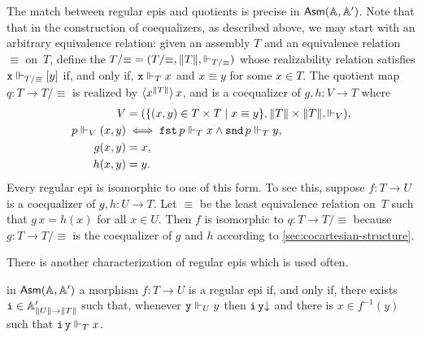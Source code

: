 The match between regular epis and quotients is precise in $\AsmA$.
Note that that in the construction of coequalizers, as described
above, we may start with an arbitrary equivalence relation: given an
assembly $T$ and an equivalence relation $\equiv$ on~$T$, define
the  $T/{\equiv} = (T/{\equiv}, \T{T},
\rz[T/{\equiv}])$ whose realizability relation satisfies $\R{x}
\rz[T/{\equiv}] [y]$ if, and only if, $\R{x} \rz[T] x$ and $x \equiv
y$ for some $x \in T$. The quotient map $q : T \to T/{\equiv}$ is
realized by $\tpcalam{x}{\T{T}} x$, and is a coequalizer of $g,
h : V \to T$ where
%
\begin{align*}
  V &= (\set{(x,y) \in T \times T \such x \equiv y},
             \T{T} \times \T{T}, {\rz[V]}),\\
  p \rz[V] (x,y) &\iff
  \combFst\,p \rz[T] x \land \combSnd\,p \rz[T] y, \\
  g (x, y) &= x,\\
  h (x, y) &= y.
\end{align*}
%
Every regular epi is isomorphic to one of this form. To see this,
suppose $f : T \to U$ is a coequalizer of $g, h : U
\to T$. Let $\equiv$ be the least equivalence relation on~$T$
such that $g\,x = h(x)$ for all $x \in U$. Then $f$ is isomorphic to
$q : T \to T/{\equiv}$ because $g : T \to
T/{\equiv}$ is the coequalizer of $g$ and $h$ according to
\cref{sec:cocartesian-structure}.

There is another characterization of regular epis which is used often.

\begin{proposition}
  \label{prop:reg-epi-when}%
  in $\AsmA$ a morphism $f : T \to U$ is a regular epi
  if, and only if, there exists $\R{i} \in \subAtyp{\T{U} \to \T{T}}$
  such that, whenever $\R{y} \rz[U] y$ then $\defined{\R{i}\,\R{y}}$
  and there is $x \in f^{-1}(y)$ such that $\R{i}\,\R{y} \rz[T] x$.
\end{proposition}

